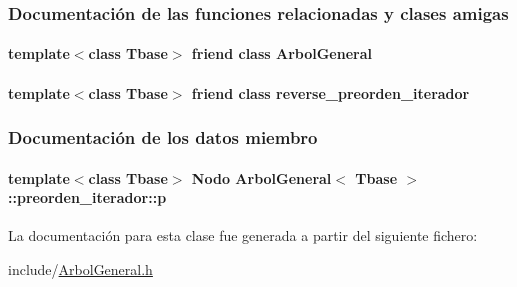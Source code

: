 \subsubsection{Documentación de las funciones relacionadas y clases amigas}
\paragraph[{\texorpdfstring{Arbol\+General}{ArbolGeneral}}]{\setlength{\rightskip}{0pt plus 5cm}template$<$class Tbase$>$ friend class {\bf Arbol\+General}\hspace{0.3cm}{\ttfamily [friend]}}\hypertarget{classArbolGeneral_1_1preorden__iterador_a9c06e31b7c3e0d4ee5b03003d32935a5}{}\label{classArbolGeneral_1_1preorden__iterador_a9c06e31b7c3e0d4ee5b03003d32935a5}
\paragraph[{\texorpdfstring{reverse\+\_\+preorden\+\_\+iterador}{reverse_preorden_iterador}}]{\setlength{\rightskip}{0pt plus 5cm}template$<$class Tbase$>$ friend class {\bf reverse\+\_\+preorden\+\_\+iterador}\hspace{0.3cm}{\ttfamily [friend]}}\hypertarget{classArbolGeneral_1_1preorden__iterador_ad7df6535fb84021c7c3804850af9fdcd}{}\label{classArbolGeneral_1_1preorden__iterador_ad7df6535fb84021c7c3804850af9fdcd}


\subsubsection{Documentación de los datos miembro}
\paragraph[{\texorpdfstring{p}{p}}]{\setlength{\rightskip}{0pt plus 5cm}template$<$class Tbase$>$ {\bf Nodo} {\bf Arbol\+General}$<$ Tbase $>$\+::preorden\+\_\+iterador\+::p\hspace{0.3cm}{\ttfamily [private]}}\hypertarget{classArbolGeneral_1_1preorden__iterador_afac01ba5fdc1e10c2a808d92f1dbddaf}{}\label{classArbolGeneral_1_1preorden__iterador_afac01ba5fdc1e10c2a808d92f1dbddaf}


La documentación para esta clase fue generada a partir del siguiente fichero\+:\begin{DoxyCompactItemize}
\item 
include/\hyperlink{ArbolGeneral_8h}{Arbol\+General.\+h}\end{DoxyCompactItemize}
